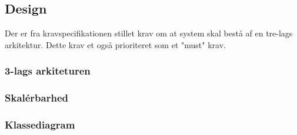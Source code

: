 \subsection{Design}
Der er fra kravspecifikationen stillet krav om at system skal bestå af en
tre-lags arkitektur. Dette krav et også prioriteret som et "must" krav.

\subsubsection{3-lags arkiteturen}%
\label{ssub:3_lags_arkiteturen}


\subsubsection{Skalérbarhed}%
\label{ssub:skalerbarhed}


\subsubsection{Klassediagram}%
\label{ssub:klassediagram}


